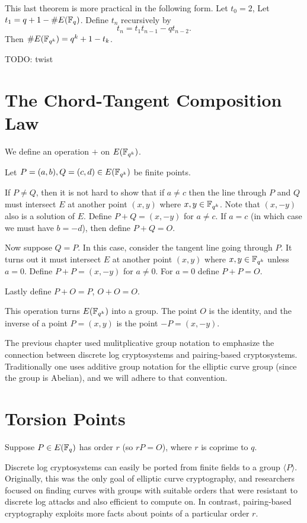 This last theorem is more practical in the following form. Let $t_0 = 2$,
Let $t_1 = q + 1 - \#E(\mathbb{F}_q)$.
Define $t_n$ recursively by
\[ t_n = t_1 t_{n-1} - q t_{n-2} .\]
Then $\#E(\mathbb{F}_{q^k}) = q^k + 1 - t_k$.

TODO: twist

\section {The Chord-Tangent Composition Law}

We define an operation $+$ on $E(\mathbb{F}_{q^k})$.

Let $P = (a,b), Q = (c,d) \in E(\mathbb{F}_{q^k})$ be finite points.

If $P \ne Q$, then it is not hard to show that if $a \ne c$
then the line through $P$ and $Q$ must intersect $E$ at another point
$(x,y)$ where $x, y\in \mathbb{F}_{q^k}$. Note that $(x,-y)$ also is a solution of $E$.
Define $P + Q = (x, -y)$ for $a \ne c$.
If $a = c$ (in which case we must have $b = -d$),
then define $P + Q = O$.

Now suppose $Q = P$. In this case, consider the tangent line going through
$P$. It turns out it must intersect $E$ at another point $(x,y)$ where
$x,y\in\mathbb{F}_{q^k}$ unless $a = 0$. Define $P + P = (x, -y)$ for $a \ne 0$.
For $a = 0$ define $P + P = O$.

Lastly define $P + O = P$, $O + O = O$.

This operation turns $E(\mathbb{F}_{q^k})$ into a group.
The point $O$ is the identity, and the inverse
of a point $P = (x,y)$ is the point $-P = (x,-y)$.

The previous chapter used mulitplicative group notation to emphasize
the connection
between discrete log cryptosystems and pairing-based cryptosystems.
Traditionally one uses additive group notation for the elliptic curve group
(since the group is Abelian), and we will adhere to that convention.

\section {Torsion Points}

Suppose $P\in E(\mathbb{F}_q)$ has order $r$ (so $r P = O$),
where $r$ is coprime to $q$.

Discrete log cryptosystems can easily be ported from finite fields
to a group $\langle P \rangle$.
Originally, this was the only goal of elliptic curve cryptography,
and researchers focused on finding curves with groups with
suitable orders that were resistant to discrete log attacks and also
efficient to compute on.
In contrast, pairing-based cryptography exploits more facts
about points of a particular order $r$.

